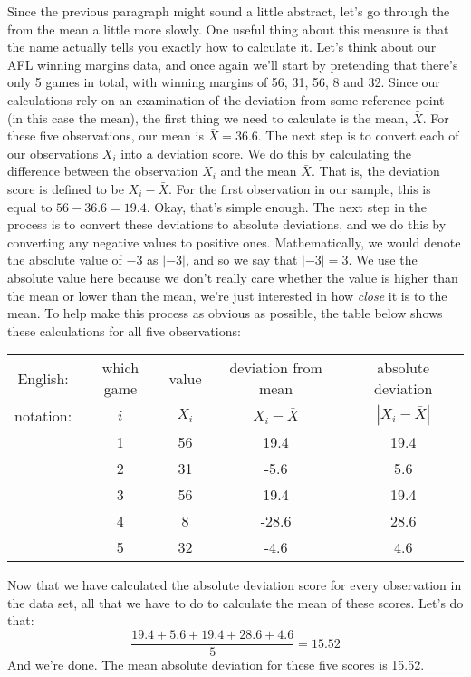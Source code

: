 Since the previous paragraph might sound a little abstract, let's go through the  from the mean a little more slowly. One useful thing about this measure is that the name actually tells you exactly how to calculate it. Let's think about our AFL winning margins data, and once again we'll start by pretending that there's only 5 games in total, with winning margins of 56, 31, 56, 8 and 32. Since our calculations rely on an examination of the deviation from some reference point (in this case the mean), the first thing we need to calculate is the mean, $\bar{X}$. For these five observations, our mean is $\bar{X} = 36.6$. The next step is to convert each of our observations $X_i$ into a deviation score. We do this by calculating the difference between the observation $X_i$ and the mean $\bar{X}$. That is, the deviation score is defined to be $X_i - \bar{X}$. For the first observation in our sample, this is equal to $56 - 36.6 = 19.4$. Okay, that's simple enough. The next step in the process is to convert these deviations to absolute deviations, and we do this by converting any negative values to positive ones. Mathematically, we would denote the absolute value of $-3$ as $|-3|$, and so we say that $|-3| = 3$. We use the absolute value here because we don't really care whether the value is higher than the mean or lower than the mean, we're just interested in how {\it close} it is to the mean. To help make this process as obvious as possible, the table below shows these calculations for all five observations:

\begin{center}
\begin{tabular}{ccccc} 
English: & which game & value & deviation from mean & absolute deviation \\
notation: & $i$ & $X_i$ & $X_i - \bar{X}$ &  $|X_i - \bar{X}|$ \\ \hline
& 1 & 56 & 19.4  & 19.4\\
& 2 & 31 &  -5.6 & 5.6\\ 
& 3 & 56 & 19.4  & 19.4\\
& 4 & 8 & -28.6  & 28.6\\
& 5 & 32 & -4.6  & 4.6 \\
\end{tabular}
\end{center}

\noindent
Now that we have calculated the absolute deviation score for every observation in the data set, all that we have to do to calculate the mean of these scores. Let's do that:
$$
\frac{19.4 + 5.6 + 19.4 + 28.6 + 4.6}{5} = 15.52
$$
And we're done. The mean absolute deviation for these five scores is 15.52. 


